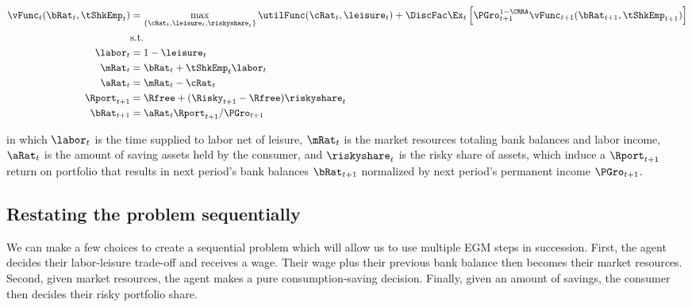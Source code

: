 \documentclass[\econtexRoot/SequentialEGM]{subfiles}
\begin{document}
\begin{equation}
  \begin{split}
    \vFunc_{t}(\bRat_{t}, \tShkEmp_{t}) & = \max_{\{\cRat_{t},
      \leisure_{t}, \riskyshare_{t}\}} \utilFunc(\cRat_{t}, \leisure_{t}) +
    \DiscFac \Ex_{t} \left[ \PGro_{t+1}^{1-\CRRA}
      \vFunc_{t+1} (\bRat_{t+1},
      \tShkEmp_{t+1}) \right] \\
    & \text{s.t.} \\
    \labor_{t} & = 1 - \leisure_{t} \\
    \mRat_{t} & = \bRat_{t} + \tShkEmp_{t}\labor_{t} \\
    \aRat_{t} & = \mRat_{t} - \cRat_{t} \\
    \Rport_{t+1} & = \Rfree + (\Risky_{t+1} - \Rfree)
    \riskyshare_{t} \\
    \bRat_{t+1} & = \aRat_{t} \Rport_{t+1} / \PGro_{t+1}
  \end{split}
\end{equation}

in which $\labor_{t}$ is the time supplied to labor net of leisure, $\mRat_{t}$ is the market resources totaling bank balances and labor income, $\aRat_{t}$ is the amount of saving assets held by the consumer, and $\riskyshare_{t}$ is the risky share of assets, which induce a $\Rport_{t+1}$ return on portfolio that results in next period's bank balances $\bRat_{t+1}$ normalized by next period's permanent income $\PGro_{t+1}$.


\subsection{Restating the problem sequentially}

We can make a few choices to create a sequential problem which will allow us to use multiple EGM steps in succession. First, the
agent decides their labor-leisure trade-off and receives a wage. Their wage
plus their previous bank balance then becomes their market resources. Second, given
market resources, the agent makes a pure consumption-saving decision. Finally, given an amount of savings, the consumer then decides their risky portfolio share.
\end{document}
